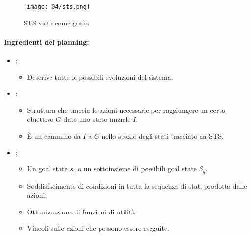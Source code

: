 
\begin{figure}[h]
    \centering
    \texttt{[image: 04/sts.png]}
    \caption{STS visto come grafo.}
\end{figure}

\paragraph{Ingredienti del planning:}

\begin{itemize}
  \item {}: 
    \begin{itemize}
      \item Descrive tutte le possibili evoluzioni del sistema. 
    \end{itemize}
  \item {}:
    \begin{itemize}
      \item Struttura che traccia le azioni necessarie per raggiungere un certo obiettivo $G$ dato uno stato iniziale $I$. 
      \item È un cammino da $I$ a $G$ nello spazio degli stati tracciato da STS.  
    \end{itemize}
  \item {}:
    \begin{itemize}
      \item Un goal state $s_g$ o un sottoinsieme di possibili goal state $S_g$. 
      \item Soddisfacimento di condizioni in tutta la sequenza di stati prodotta dalle azioni. 
      \item Ottimizzazione di funzioni di utilità. 
      \item Vincoli sulle azioni che possono essere eseguite.
    \end{itemize}
\end{itemize}

